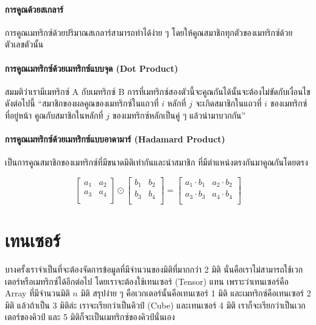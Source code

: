 \paragraph{การคูณด้วยสเกลาร์} การคูณเมทริกซ์ด้วยปริมาณสเกลาร์สามารถทำได้ง่าย ๆ โดยให้คูณสมาชิกทุกตัวของเมทริกซ์ด้วยตัวเลขตัวนั้น

\paragraph{การคูณเมทริกซ์ด้วยเมทริกซ์แบบจุด (Dot Product)}
สมมติว่าเรามีเมทริกซ์ A กับเมทริกซ์ B การที่เมทริกซ์สองตัวนี้จะคูณกันได้นั้นจะต้องไม่ขัดกับเงื่อนไขดังต่อไปนี้
\enquote{สมาชิกของผลคูณของเมทริกซ์ในแถวที่ $i$ หลักที่ $j$ จะเกิดสมาชิกในแถวที่ $i$ ของเมทริกซ์ที่อยู่หน้า คูณกับสมาชิกในหลักที่ $j$ 
ของเมทริกซ์หลักเป็นคู่ ๆ แล้วนำมาบวกกัน}

\paragraph{การคูณเมทริกซ์ด้วยเมทริกซ์แบบอาดามาร์ (Hadamard Product)} เป็นการคูณสมาชิกของเมทริกซ์ที่มีขนาดมิติเท่ากันและนำสมาชิก%
ที่มีตำแหน่งตรงกันมาคูณกันโดยตรง

\begin{equation}
    \begin{bmatrix}
        a_1 & a_2 \\
        a_3 & a_4 \\
    \end{bmatrix}
    \odot
    \begin{bmatrix}
        b_1 & b_2 \\
        b_3 & b_4 \\
    \end{bmatrix}
    =
    \begin{bmatrix}
        a_1 \cdot b_1 & a_2 \cdot b_2 \\
        a_3 \cdot b_3 & a_4 \cdot b_4 \\
    \end{bmatrix}
\end{equation}

\section{เทนเซอร์}
\label{sec:tensor}

บางครั้งเราจำเป็นที่จะต้องจัดการข้อมูลที่มีจำนวนของมิติที่มากกว่า 2 มิติ นั่นคือเราไม่สามารถใช้เวกเตอร์หรือเมทริกซ์ได้อีกต่อไป
โดยเราจะต้องใช้เทนเซอร์ (Tensor) แทน เพราะว่าเทนเซอร์คือ Array ที่มีจำนวนมิติ $n$ มิติ สรุปง่าย ๆ คือเวกเตอร์นั้นคือเทนเซอร์ 1 มิติ 
และเมทริกซ์คือเทนเซอร์ 2 มิติ แล้วถ้าเป็น 3 มิติล่ะ เราจะเรียกว่าเป็นคิวป์ (Cube) และเทนเซอร์ 4 มิติ เราก็จะเรียกว่าเป็นเวกเตอร์ของคิวป์ 
และ 5 มิติก็จะเป็นเมทริกซ์ของคิวป์นั่นเอง
